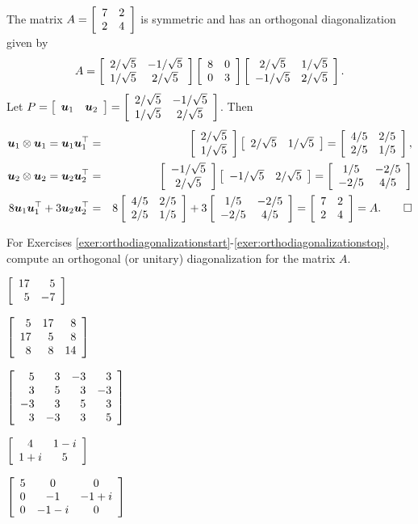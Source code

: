 \begin{Exam} The matrix $A = \mtx{cc}{7&2\\2&4}$ is symmetric and has an orthogonal diagonalization given by
\[A = \mtx{cc}{2/\sqrt{5} & -1/\sqrt{5} \\ 1/\sqrt{5} & 2/\sqrt{5}}\mtx{cc}{8&0\\0&3}\mtx{cc}{2/\sqrt{5} & 1/\sqrt{5} \\ -1/\sqrt{5} & 2/\sqrt{5}}.\] Let $P = \mtx{cc}{\bb u_1 & \bb u_2} = \mtx{cc}{2/\sqrt{5} & -1/\sqrt{5} \\ 1/\sqrt{5} & 2/\sqrt{5}}$. Then 
\begin{eqnarray*}
\bb u_1 \otimes \bb u_1 = \bb u_1\bb u_1^\top  &=& \mtx{c}{2/\sqrt{5}\\1/\sqrt{5}}\mtx{cc}{2/\sqrt{5} & 1/\sqrt{5}} = \mtx{cc}{4/5 & 2/5 \\ 2/5 & 1/5},\\
\bb u_2 \otimes \bb u_2 =  \bb u_2\bb u_2^\top  &=& \mtx{c}{-1/\sqrt{5}\\2/\sqrt{5}}\mtx{cc}{-1/\sqrt{5} & 2/\sqrt{5}} = \mtx{cc}{1/5 & -2/5 \\ -2/5 & 4/5}\\
8\bb u_1\bb u_1^\top  + 3\bb u_2\bb u_2^\top  &=& 8\mtx{cc}{4/5 & 2/5 \\ 2/5 & 1/5} + 3\mtx{cc}{1/5 & -2/5 \\ -2/5 & 4/5} = \mtx{cc}{7&2\\2&4} = A.\qedhere
\end{eqnarray*}
\end{Exam}\vs


\noindent For Exercises \ref{exer:orthodiagonalizationstart}-\ref{exer:orthodiagonalizationstop}, compute an orthogonal (or unitary) diagonalization for the matrix $A$. 
\begin{enumerate}[!HW!, start=1, label=$\spadesuit$ \arabic*., ref=\arabic*]
\begin{multicols}{3}
\item\label{exer:orthodiagonalizationstart} $\mtx{rr}{17&5\\5&-7}$ %
\item\label{exer:orthodiagonalizationsecond} $\mtx{rrr}{5&17&8\\17&5&8\\8&8&14}$ %
\item\label{exer:orthodiagonalizationthird} $\mtx{rrrr}{5&3&-3&3\\3&5&3&-3\\-3&3&5&3\\3&-3&3&5}$ %
\end{multicols}
\begin{multicols}{2}
\item $\mtx{cc}{4 & 1-i \\ 1+i & 5}$ %
\item\label{exer:orthodiagonalizationstop} $\mtx{ccc}{5 & 0 & 0\\ 0 & -1 & -1+ i \\ 0 & -1-i & 0}$ %
\end{multicols}
\end{enumerate}

